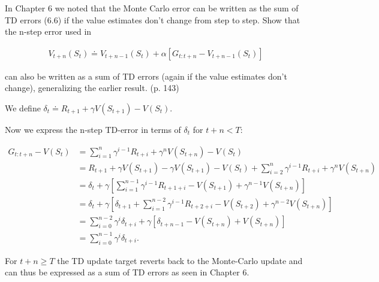 
\begin{exercise}[Exercise 7.1]

In Chapter 6 we noted that the Monte Carlo error can be written as the sum 
of TD errors (6.6) if the value estimates don't change from step to step.
Show that the n-step error used in

\begin{align*}
    V_{t+n}(S_t) \doteq V_{t+n-1}(S_t) + \alpha[G_{t:t+n} - V_{t+n-1}(S_t)]
    \tag{7.2}
\end{align*}

can also be written as a sum of TD
errors (again if the value estimates don't change), generalizing the
earlier result. (p. 143)
\end{exercise}


\begin{solution}

We define $\delta_t \doteq R_{t+1} + \gamma V(S_{t+1}) - V(S_t)$.

Now we express the n-step TD-error in terms of $\delta_t$ for $t + n < T$:

\begin{align*}
    G_{t:t+n} - V(S_t) 
    &= \sum_{i=1}^n \gamma^{i-1} R_{t+i} + \gamma^n V(S_{t+n}) - V(S_t) \\
    &= R_{t+1} + \gamma V(S_{t+1}) - \gamma V(S_{t+1}) - V(S_t) + \sum_{i=2}^n \gamma^{i-1} R_{t+i} + \gamma^n V(S_{t+n}) \\
    &= \delta_t + \gamma \left[\sum_{i=1}^{n-1} \gamma^{i-1} R_{t+1+i} - V(S_{t+1})+ \gamma^{n-1} V(S_{t+n})\right]  \\
    &= \delta_t + \gamma \left[ \delta_{t+1} + \sum_{i=1}^{n-2} \gamma^{i-1} R_{t+2+i} - V(S_{t+2})+ \gamma^{n-2} V(S_{t+n})\right] \\
    &= \sum_{i=0}^{n-2} \gamma^i \delta_{t+i} + \gamma \left[ \delta_{t+n-1} - V(S_{t+n})  + V(S_{t+n})\right] \\
    &= \sum_{i=0}^{n-1} \gamma^i \delta_{t+i}.
\end{align*}

For $t + n \geq T$ the TD update target reverts back to the Monte-Carlo update
and can thus be expressed as a sum of TD errors as seen in Chapter 6.
\end{solution}

